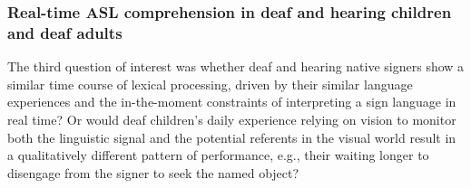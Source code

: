 \documentclass[oneside]{report}
\begin{document}
\subsubsection{Real-time ASL comprehension in deaf and hearing children
and deaf
adults}\label{real-time-asl-comprehension-in-deaf-and-hearing-children-and-deaf-adults}

The third question of interest was whether deaf and hearing native
signers show a similar time course of lexical processing, driven by
their similar language experiences and the in-the-moment constraints of
interpreting a sign language in real time? Or would deaf children's
daily experience relying on vision to monitor both the linguistic signal
and the potential referents in the visual world result in a
qualitatively different pattern of performance, e.g., their waiting
longer to disengage from the signer to seek the named object?
\end{document}
